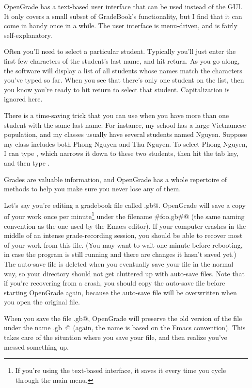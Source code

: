 \documentclass{opengrade_doc}
\begin{document}
\label{textui}
OpenGrade has a text-based user interface that can be used instead of the GUI.
It only covers a small subset of GradeBook's functionality,
but I find that it can come in handy once in a while.
The user interface is menu-driven, and is fairly self-explanatory.

Often you'll need to select a particular student. Typically
you'll just enter the first few characters of the student's last name,
and hit return. As you go along, the software will display a list of
all students whose names match the characters you've typed so far. When
you see that there's only one student on the list, then you know you're
ready to hit return to select that student. Capitalization is ignored
here.

There is a time-saving trick that you can use when you have more than
one student with the same last name. For instance, my school has a large
Vietnamese population, and my classes usually have several students named
Nguyen. Suppose my class includes both Phong Nguyen and
Thu Nguyen. To select Phong Nguyen, I can type \verb@ng@, which narrows
it down to these two students, then hit the tab key, and then type \verb@p@.

\label{safety}
Grades are valuable information, and OpenGrade has a whole
repertoire of methods to help you make sure you never lose any
of them. 

Let's say you're editing a gradebook file called \verb@foo.gb@. 
OpenGrade will
save a copy of your work once per minute\footnote{If you're using the text-based
interface, it saves it every time you cycle through the main menu.}
under the
filename \verb@#foo.gb#@ (the same naming convention as the one
used by the Emacs editor). If your computer crashes in the middle
of an intense grade-recording session, you should be able to
recover most of your work from this file. (You may want to wait
one minute before rebooting, in case the program is still running and
there are changes it hasn't saved yet.)
The auto-save file is
deleted when you eventually save your file in the normal way,
so your directory should not get cluttered up with auto-save files.
Note that if you're recovering from a crash, you should
copy the auto-save file before starting OpenGrade again,
because the auto-save file will be overwritten when you open the
original file.

When you save the file \verb@foo.gb@, OpenGrade will
preserve the old version of the file under the name
\verb@foo.gb~@ (again, the name is based on the Emacs convention).
This takes care of the situation where you
save your file, and then realize you've messed something up.
\end{document}
